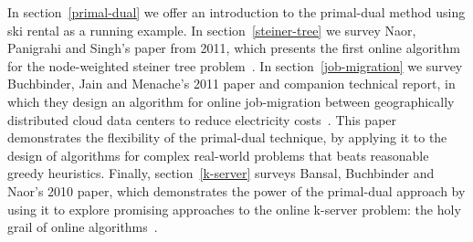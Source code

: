 In section~\ref{primal-dual} we offer an introduction to the primal-dual method using ski rental as a running example.
In section~\ref{steiner-tree} we survey Naor, Panigrahi and Singh's paper from 2011, which presents the first online algorithm for the node-weighted steiner tree problem~\cite{naor11:node-weighted-steiner-tree}.
In section~\ref{job-migration} we survey Buchbinder, Jain and Menache's 2011 paper and companion technical report, in which they design an algorithm for online job-migration between geographically distributed cloud data centers to reduce electricity costs~\cite{buchbinder11:job-migration,buchbinder11:job-migration-techreport}.
This paper demonstrates the flexibility of the primal-dual technique, by applying it to the design of algorithms for complex real-world problems that beats reasonable greedy heuristics.
Finally, section~\ref{k-server} surveys Bansal, Buchbinder and Naor's 2010 paper, which demonstrates the power of the primal-dual approach by using it to explore promising approaches to the online k-server problem: the holy grail of online algorithms~\cite{bansal10:k-server}.
